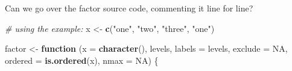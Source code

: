 \documentclass[]{book}
\newenvironment{Shaded}{\begin{snugshade}}{\end{snugshade}}
\newcommand{\CommentTok}[1]{\textcolor[rgb]{0.56,0.35,0.01}{\textit{#1}}}
\newcommand{\ControlFlowTok}[1]{\textcolor[rgb]{0.13,0.29,0.53}{\textbf{#1}}}
\newcommand{\DataTypeTok}[1]{\textcolor[rgb]{0.13,0.29,0.53}{#1}}
\newcommand{\KeywordTok}[1]{\textcolor[rgb]{0.13,0.29,0.53}{\textbf{#1}}}
\newcommand{\NormalTok}[1]{#1}
\newcommand{\OtherTok}[1]{\textcolor[rgb]{0.56,0.35,0.01}{#1}}
\newcommand{\StringTok}[1]{\textcolor[rgb]{0.31,0.60,0.02}{#1}}
\begin{document}
Can we go over the factor source code, commenting it line for line?

\begin{Shaded}
\begin{Highlighting}[]
\CommentTok{# using the example:}
\NormalTok{x <-}\StringTok{ }\KeywordTok{c}\NormalTok{(}\StringTok{"one"}\NormalTok{, }\StringTok{"two"}\NormalTok{, }\StringTok{"three"}\NormalTok{, }\StringTok{"one"}\NormalTok{)}

\NormalTok{factor <-}\StringTok{ }\ControlFlowTok{function}\NormalTok{ (}\DataTypeTok{x =} \KeywordTok{character}\NormalTok{(), levels, }\DataTypeTok{labels =}\NormalTok{ levels, }\DataTypeTok{exclude =} \OtherTok{NA}\NormalTok{, }\DataTypeTok{ordered =} \KeywordTok{is.ordered}\NormalTok{(x), }\DataTypeTok{nmax =} \OtherTok{NA}\NormalTok{) \{}
 

\end{Highlighting}
\end{Shaded}
\end{document}
